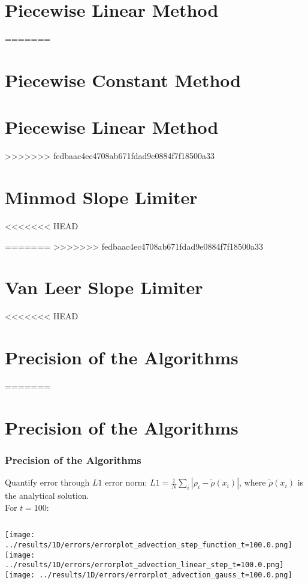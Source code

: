 \section{Piecewise Linear Method}




=======
\section{Piecewise Constant Method}


\section{Piecewise Linear Method}


>>>>>>> fedbaac4ec4708ab671fdad9e0884f7f18500a33
\section{Minmod Slope Limiter}



<<<<<<< HEAD

=======
>>>>>>> fedbaac4ec4708ab671fdad9e0884f7f18500a33
\section{Van Leer Slope Limiter}



<<<<<<< HEAD

\section{Precision of the Algorithms}

=======
\section{Precision of the Algorithms}

\begin{frame}
	\frametitle{Precision of the Algorithms}
	Quantify error through $L1$ error norm: $L1 = \frac{1}{N} \sum\limits_i |\rho_i - \tilde{\rho}(x_i)|$, where $\tilde{\rho}(x_i)$ is the analytical solution.\\[2em]
	
	For $t = 100$:\\\vfill
	
	\begin{columns}
			\texttt{[image: ../results/1D/errors/errorplot\_advection\_step\_function\_t=100.0.png]}
			\texttt{[image: ../results/1D/errors/errorplot\_advection\_linear\_step\_t=100.0.png]}
			\texttt{[image: ../results/1D/errors/errorplot\_advection\_gauss\_t=100.0.png]}	
	\end{columns}
	
\end{frame}






